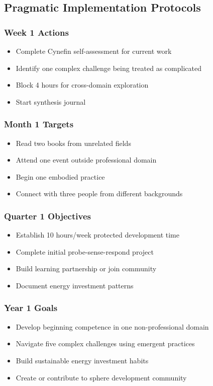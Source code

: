\subsection{Pragmatic Implementation Protocols}

\subsubsection{Week 1 Actions}
\begin{itemize}
\item Complete Cynefin self-assessment for current work
\item Identify one complex challenge being treated as complicated
\item Block 4 hours for cross-domain exploration
\item Start synthesis journal
\end{itemize}

\subsubsection{Month 1 Targets}
\begin{itemize}
\item Read two books from unrelated fields
\item Attend one event outside professional domain
\item Begin one embodied practice
\item Connect with three people from different backgrounds
\end{itemize}

\subsubsection{Quarter 1 Objectives}
\begin{itemize}
\item Establish 10 hours/week protected development time
\item Complete initial probe-sense-respond project
\item Build learning partnership or join community
\item Document energy investment patterns
\end{itemize}

\subsubsection{Year 1 Goals}
\begin{itemize}
\item Develop beginning competence in one non-professional domain
\item Navigate five complex challenges using emergent practices
\item Build sustainable energy investment habits
\item Create or contribute to sphere development community
\end{itemize}

